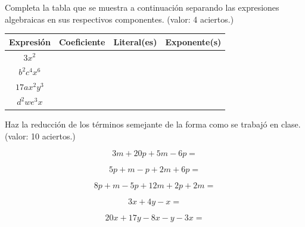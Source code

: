 \documentclass[11pt]{article}
\begin{document}
Completa la tabla que se muestra a continuaci\'on separando las expresiones
algebraicas en sus respectivos componentes. (valor: 4 aciertos.)

\begin{center}
\bgroup
\def\arraystretch{2}
\begin{tabular}{|c|c|c|c|}
\hline
Expresi\'on & Coeficiente & Literal(es) & Exponente(s)  \\ \hline 
$3x^2$ &&&\\ \hline
$b^2c^4x^6$ &&&\\ \hline
$17ax^2y^3$ &&&\\ \hline
$d^2we^3x$ &&&\\ \hline
\end{tabular}
\egroup
\end{center}

Haz la reducci\'on de los t\'erminos semejante de la forma como se trabaj\'o en
clase. (valor: 10 aciertos.)

\begin{equation*}
3m + 20p + 5m - 6p = 
\end{equation*}

\vspace{4mm}

\begin{equation*}
5p + m -p +2m + 6p =
\end{equation*}

\vspace{4mm}

\begin{equation*}
8p + m -5p + 12m + 2p + 2m =
\end{equation*}

\vspace{4mm}

\begin{equation*}
3x + 4y - x = 
\end{equation*}

\vspace{4mm}

\begin{equation*}
20x + 17y - 8x - y -3x =
\end{equation*}
\end{document}
